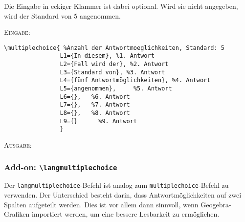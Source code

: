 \documentclass[a4paper,12pt]{article}
\begin{document}
				

Die Eingabe in eckiger Klammer ist dabei optional. Wird sie nicht angegeben, wird der Standard von 5 angenommen. 

\leer




\textsc{Eingabe:}
\begin{verbatim}
\multiplechoice{ %Anzahl der Antwortmoeglichkeiten, Standard: 5
				L1={In diesem}, %1. Antwort 
				L2={Fall wird der}, %2. Antwort
				L3={Standard von}, %3. Antwort
				L4={fünf Antwortmöglichkeiten}, %4. Antwort
				L5={angenommen},	 %5. Antwort
				L6={},	 %6. Antwort
				L7={},	 %7. Antwort
				L8={},	 %8. Antwort
				L9={}	   %9. Antwort
				}
\end{verbatim}

\textsc{Ausgabe:}


\leer
\newpage

\subsubsection{Add-on: \texttt{\textbackslash langmultiplechoice}}

Der \texttt{langmultiplechoice}-Befehl ist analog zum \texttt{multiplechoice}-Befehl zu verwenden. Der Unterschied besteht darin, dass Antwortmöglichkeiten auf zwei Spalten aufgeteilt werden. Dies ist vor allem dann sinnvoll, wenn Geogebra-Grafiken importiert werden, um eine bessere Lesbarkeit zu ermöglichen.
\end{document}
